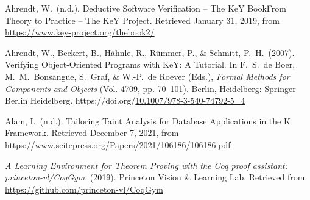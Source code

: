 \documentclass[12pt,twoside]{article}
\begin{document}
{\begin{thebibliography}{1079}
\mdbibitemlabel{}Ahrendt, W.~(n.d.). Deductive Software Verification – The KeY BookFrom Theory to Practice – The KeY Project. Retrieved January 31, 2019, from \href{https://www.key-project.org/thebook2/}{{\ttfamily https://\hspace{0pt}www.\hspace{0pt}key-\hspace{0pt}project.\hspace{0pt}org/\hspace{0pt}thebook2/\hspace{0pt}}}%

\mdbibitemlabel{}Ahrendt, W., Beckert, B., Hähnle, R., Rümmer, P., \& Schmitt, P.~H.~(2007). Verifying Object-Oriented Programs with KeY: A Tutorial. In F.~S.~de Boer, M.~M.~Bonsangue, S.~Graf, \& W.-P.~de Roever (Eds.), \emph{Formal Methods for Components and Objects} (Vol. 4709, pp. 70–101). Berlin, Heidelberg: Springer Berlin Heidelberg. https://doi.org/\href{https://dx.doi.org/10.1007/978-3-540-74792-5_4}{10.1007/978-3-540-74792-5\_4}%

\mdbibitemlabel{}Alam, I.~(n.d.). Tailoring Taint Analysis for Database Applications in the K Framework. Retrieved December 7, 2021, from \href{https://www.scitepress.org/Papers/2021/106186/106186.pdf}{{\ttfamily https://\hspace{0pt}www.\hspace{0pt}scitepress.\hspace{0pt}org/\hspace{0pt}Papers/\hspace{0pt}2021/\hspace{0pt}106186/\hspace{0pt}106186.\hspace{0pt}pdf}}%

\mdbibitemlabel{}\emph{A Learning Environment for Theorem Proving with the Coq proof assistant: princeton-vl/CoqGym}. (2019). Princeton Vision \& Learning Lab. Retrieved from \href{https://github.com/princeton-vl/CoqGym}{{\ttfamily https://\hspace{0pt}github.\hspace{0pt}com/\hspace{0pt}princeton-\hspace{0pt}vl/\hspace{0pt}CoqGym}}%


\end{thebibliography}}
\end{document}
